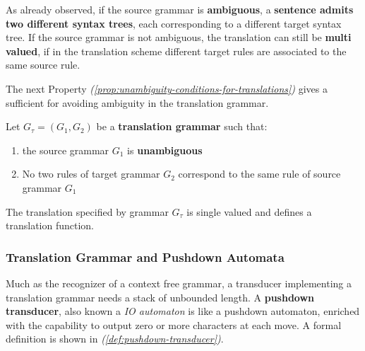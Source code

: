 \documentclass[english]{article}
\begin{document}
As already observed, if the source grammar is \textbf{ambiguous}, a \textbf{sentence admits two different syntax trees}, each corresponding to a different target syntax tree.
If the source grammar is not ambiguous, the translation can still be \textbf{multi valued}, if in the translation scheme different target rules are associated to the same source rule.

The next Property \textit{(\ref{prop:unambiguity-conditions-for-translations})} gives a sufficient for avoiding ambiguity in the translation grammar.

\begin{property}
  \label{prop:unambiguity-conditions-for-translations}
  Let \(G_\tau = \left( G_1, G_2 \right)\) be a \textbf{translation grammar} such that:

  \begin{enumerate}
    \item the source grammar \(G_1\) is \textbf{unambiguous}
    \item No two rules of target grammar \(G_2\) correspond to the same rule of source grammar \(G_1\)
  \end{enumerate}

  The translation specified by grammar \(G_\tau\) is single valued and defines a translation function.
\end{property}

\subsubsection{Translation Grammar and Pushdown Automata}

Much as the recognizer of a context free grammar, a transducer implementing a translation grammar needs a stack of unbounded length.
A \textbf{pushdown transducer}, also known a \textit{IO automaton} is like a pushdown automaton, enriched with the capability to output zero or more characters at each move.
A formal definition is shown in \textit{(\ref{def:pushdown-transducer})}.
\end{document}
